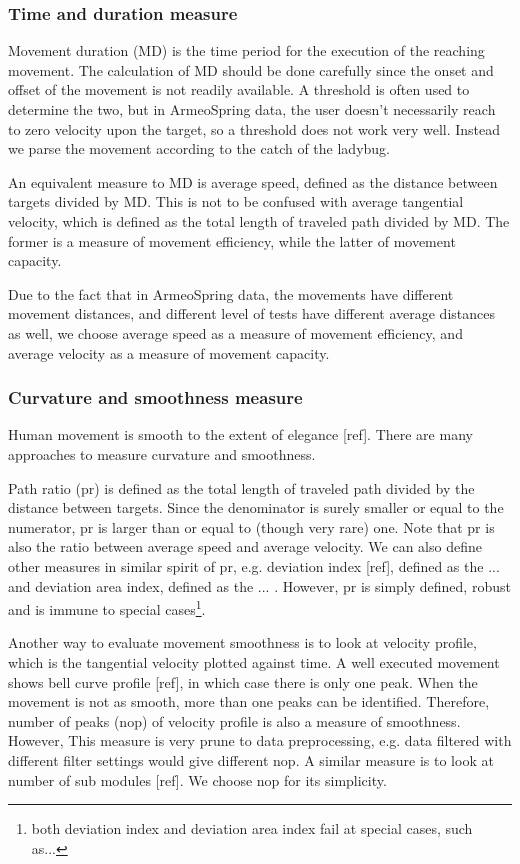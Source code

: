 \subsubsection{Time and duration measure}
Movement duration (MD) is the time period for the execution of the reaching movement. The calculation of MD should be done carefully since the onset and offset of the movement is not readily available. A threshold is often used to determine the two, but in ArmeoSpring data, the user doesn't necessarily reach to zero velocity upon the target, so a threshold does not work very well. Instead we parse the movement according to the catch of the ladybug. 

An equivalent measure to MD is average speed, defined as the distance between targets divided by MD. This is not to be confused with average tangential velocity, which is defined as the total length of traveled path divided by MD. The former is a measure of movement efficiency, while the latter of movement capacity. 

Due to the fact that in ArmeoSpring data, the movements have different movement distances, and different level of tests have different average distances as well, we choose average speed as a measure of movement efficiency, and average velocity as a measure of movement capacity. 

\subsubsection{Curvature and smoothness measure}
Human movement is smooth to the extent of elegance [ref]. There are many approaches to measure curvature and smoothness.

Path ratio (pr) is defined as the total length of traveled path divided by the distance between targets. Since the denominator is surely smaller or equal to the numerator, pr is larger than or equal to (though very rare) one. Note that pr is also the ratio between average speed and average velocity. We can also define other measures in similar spirit of pr, e.g. deviation index [ref], defined as the ... and deviation area index, defined as the ... . However, pr is simply defined, robust and is immune to special cases\footnote{both deviation index and deviation area index fail at special cases, such as...}. 

Another way to evaluate movement smoothness is to look at velocity profile, which is the tangential velocity plotted against time. A well executed movement shows bell curve profile [ref], in which case there is only one peak. When the movement is not as smooth, more than one peaks can be identified. Therefore, number of peaks (nop) of velocity profile is also a measure of smoothness. However, This measure is very prune to data preprocessing, e.g. data filtered with different filter settings would give different nop. A similar measure is to look at number of sub modules [ref]. We choose nop for its simplicity.

